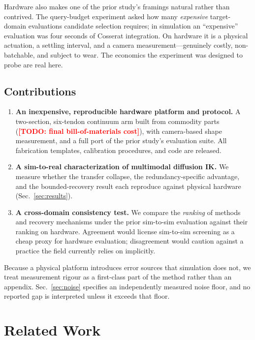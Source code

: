 \documentclass[letterpaper, 10pt, conference]{ieeeconf}
\newcommand{\todo}[1]{\textcolor{red}{\textbf{[TODO: #1]}}}
\begin{document}
Hardware also makes one of the prior study's framings natural rather than
contrived. The query-budget experiment asked how many \emph{expensive}
target-domain evaluations candidate selection requires; in simulation an
``expensive'' evaluation was four seconds of Cosserat integration. On
hardware it is a physical actuation, a settling interval, and a camera
measurement---genuinely costly, non-batchable, and subject to wear. The
economics the experiment was designed to probe are real here.

\subsection*{Contributions}

\begin{enumerate}
  \item \textbf{An inexpensive, reproducible hardware platform and protocol.}
  A two-section, six-tendon continuum arm built from commodity parts
  (\todo{final bill-of-materials cost}), with camera-based shape measurement,
  and a full port of the prior study's evaluation suite. All fabrication
  templates, calibration procedures, and code are released.

  \item \textbf{A sim-to-real characterization of multimodal diffusion IK.}
  We measure whether the transfer collapse, the redundancy-specific
  advantage, and the bounded-recovery result each reproduce against physical
  hardware (Sec.~\ref{sec:results}).

  \item \textbf{A cross-domain consistency test.} We compare the
  \emph{ranking} of methods and recovery mechanisms under the prior
  sim-to-sim evaluation against their ranking on hardware. Agreement would
  license sim-to-sim screening as a cheap proxy for hardware evaluation;
  disagreement would caution against a practice the field currently relies on
  implicitly.
\end{enumerate}

Because a physical platform introduces error sources that simulation does
not, we treat measurement rigour as a first-class part of the method rather
than an appendix. Sec.~\ref{sec:noise} specifies an independently measured
noise floor, and no reported gap is interpreted unless it exceeds that floor.

\section{Related Work}
\end{document}
